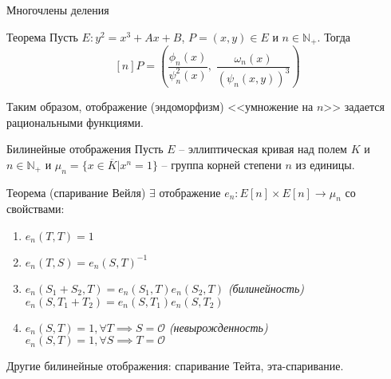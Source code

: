 \documentclass{beamer}
\begin{document}
\begin{frame}{Многочлены деления}
\begin{block}{Теорема}
    Пусть $E: {y^2} = {x^3} + Ax + B$, $P = \left( {x,y} \right) \in E$ и $n \in {\mathbb{N}_+ }$. Тогда
    \[[n] P = \left( {\frac{{{\phi _n}\left( x \right)}}{{\psi _n^2\left( x \right)}},\;\frac{{{\omega _n}\left( x \right)}}{{{{\left( {{\psi _n}\left( {x,y} \right)} \right)}^3}}}} \right)
    \]
\end{block}

Таким образом, отображение (эндоморфизм) <<умножение на $n$>> задается рациональными функциями.
\end{frame}


\begin{frame}{Билинейные отображения}
Пусть $E$ -- эллиптическая кривая над полем $K$ и $n \in \mathbb{N}_{+}$ и $\mu_n = \{x \in \overline{K} | x^n = 1\}$ -- группа корней степени $n$ из единицы.
    
\begin{block}{Теорема (спаривание Вейля)}
$\exists$ отображение
$
e_n: E[n] \times E[n] \rightarrow \mu_n
$
со свойствами:
\begin{enumerate}
\item $e_n(T,T) = 1$
\item $e_n(T,S) = e_n(S,T)^{-1}$
\item $e_n(S_1 + S_2, T) = e_n(S_1, T) e_n(S_2, T)$ \hfill \textit{(билинейность)} \\
$e_n(S, T_1 + T_2) = e_n(S, T_1) e_n(S, T_2)$
\item $e_n(S,T) = 1, \forall T \implies S = \mathcal{O}$ \hfill \textit{(невырожденность)}\\
$e_n(S,T) = 1, \forall S \implies T = \mathcal{O}$
\end{enumerate}
\end{block}

Другие билинейные отображения: спаривание Тейта, эта-спаривание.
\end{frame}

\end{document}
